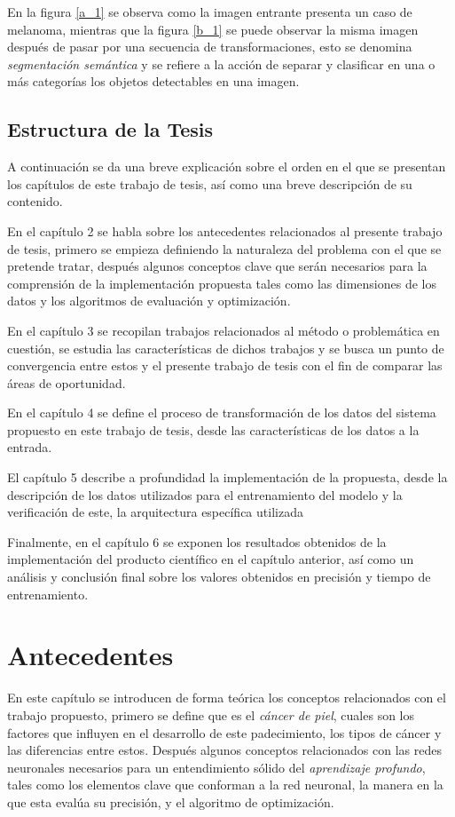 En la figura \ref{a_1} se observa como la imagen entrante presenta un caso de melanoma, mientras que la figura \ref{b_1} se puede observar la misma imagen después de pasar por una secuencia de transformaciones, esto se denomina \emph{segmentación semántica} y se refiere a la acción de separar y clasificar en una o más categorías los objetos detectables en una imagen.

\section{Estructura de la Tesis}
A continuación se da una breve explicación sobre el orden en el que se presentan los capítulos de este trabajo de tesis, así como una breve descripción de su contenido.

En el capítulo 2 se habla sobre los antecedentes relacionados al presente trabajo de tesis, primero se empieza definiendo la naturaleza del problema con el que se pretende tratar, después algunos conceptos clave que serán necesarios para la comprensión de la implementación propuesta tales como las dimensiones de los datos y los algoritmos de evaluación y optimización.

En el capítulo 3 se recopilan trabajos relacionados al método o problemática en cuestión, se estudia las características de dichos trabajos y se busca un punto de convergencia entre estos y el presente trabajo de tesis con el fin de comparar las áreas de oportunidad.

En el capítulo 4 se define el proceso de transformación de los datos del sistema propuesto en este trabajo de tesis, desde las características de los datos a la entrada.

El capítulo 5 describe a profundidad la implementación de la propuesta, desde la descripción de los datos utilizados para el entrenamiento del modelo y la verificación de este, la arquitectura específica utilizada 


Finalmente, en el capítulo 6 se exponen los resultados obtenidos de la implementación del producto científico en el capítulo anterior, así como un análisis y conclusión final sobre los valores obtenidos en precisión y tiempo de entrenamiento. 

\chapter{Antecedentes}
En este capítulo se introducen de forma teórica los conceptos relacionados con el trabajo propuesto, primero se define que es el \emph{cáncer de piel}, cuales son los factores que influyen en el desarrollo de este padecimiento, los tipos de cáncer y las diferencias entre estos. Después algunos conceptos relacionados con las redes neuronales necesarios para un entendimiento sólido del \emph{aprendizaje profundo}, tales como los elementos clave que conforman a la red neuronal, la manera en la que esta evalúa su precisión, y el algoritmo de optimización.

